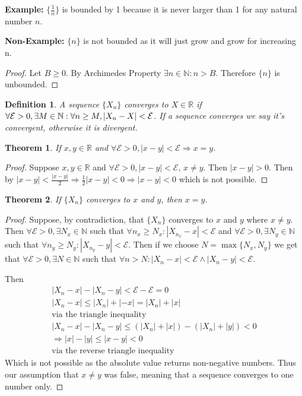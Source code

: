 \documentclass[12pt]{article}
\newtheorem{theorem}{Theorem}
\newtheorem{definition}{Definition}
\begin{document}
\noindent 
\textbf{Example:} \(\{\frac{1}{n}\}\) is bounded by 1 because it is never larger than 1 
for any natural number \(n\).

\noindent 
\textbf{Non-Example: } \(\{n\}\) is not bounded as it will just grow and grow 
for increasing n.
\begin{proof}
    Let \(B \geq 0\). By Archimedes Property \(\exists n \in \mathbb N : n > B\). 
    Therefore \(\{n\}\) is unbounded.
\end{proof}
\begin{definition}
    A sequence \(\{X_n\}\) converges to \(X \in \mathbb R\) if 
    \(\forall \mathcal E > 0, \exists M \in \mathbb N : 
    \forall n \geq M, \\ |X_n - X| < \mathcal E \).
    If a sequence converges we say it's convergent, otherwise it is divergent.
\end{definition}
\begin{theorem}
    If \(x,y \in \mathbb R\) and \(\forall \mathcal E > 0, |x-y| < \mathcal E \Rightarrow
    x = y\).
\end{theorem}
\begin{proof}
    Suppose \(x,y \in \mathbb R\) and \(\forall \mathcal E > 0, |x-y| < \mathcal E\), 
    \(x \neq y\). Then \(|x-y| > 0\). Then by \(|x-y| < \frac{|x-y|}{2} \Rightarrow 
    \frac{1}{2}|x-y| < 0 \Rightarrow |x-y| < 0\) which is not possible.
\end{proof}

\begin{theorem}
    If \(\{X_n\}\) converges to \(x\) and \(y\), then \(x = y\).
\end{theorem}
\begin{proof}
    Suppose, by contradiction, that \(\{X_n\}\) converges to \(x\) and \(y\) 
    where \(x \neq y\). 
    Then \(\forall \mathcal E > 0, \exists N_x \in \mathbb N\) such that 
    \(\forall n_x \geq N_x : |X_{n_x} - x| < \mathcal E \) and 
    \(\forall \mathcal E > 0, \exists N_y \in \mathbb N\) such that 
    \(\forall n_y \geq N_y : |X_{n_y} - y| < \mathcal E \).
    Then if we choose \(N = \max\{N_x, N_y\}\) we get that 
    \( 
        \forall \mathcal E > 0, \exists N \in \mathbb N
    \) 
    such that 
    \(\forall n > N : |X_n - x| < \mathcal E \land |X_n - y| < \mathcal E\).
    
    \noindent 
    Then 
    \begin{gather*}
        |X_n-x| - |X_n - y| < \mathcal E - \mathcal E = 0\\ 
        |X_n-x| \leq |X_n| + |-x| = |X_n| + |x| \\
        \text{via the triangle inequality} \\ 
        |X_n-x| - |X_n - y| \leq (|X_n| + |x|) - (|X_n| + |y|) < 0\\
        \Rightarrow |x| - |y| \leq |x - y| < 0 \\ 
        \text{via the reverse triangle inequality}
    \end{gather*}
    Which is not possible as the absolute value returns non-negative numbers. 
    Thus our assumption that \(x \neq y\) was false, meaning that a sequence converges 
    to one number only.
        
    
\end{proof}
\end{document}
